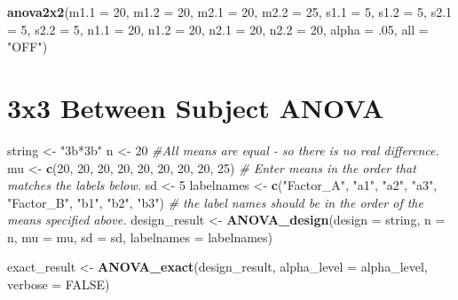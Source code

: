 \documentclass[]{book}
\newenvironment{Shaded}{\begin{snugshade}}{\end{snugshade}}
\newcommand{\CommentTok}[1]{\textcolor[rgb]{0.56,0.35,0.01}{\textit{#1}}}
\newcommand{\DataTypeTok}[1]{\textcolor[rgb]{0.13,0.29,0.53}{#1}}
\newcommand{\DecValTok}[1]{\textcolor[rgb]{0.00,0.00,0.81}{#1}}
\newcommand{\FloatTok}[1]{\textcolor[rgb]{0.00,0.00,0.81}{#1}}
\newcommand{\KeywordTok}[1]{\textcolor[rgb]{0.13,0.29,0.53}{\textbf{#1}}}
\newcommand{\NormalTok}[1]{#1}
\newcommand{\OtherTok}[1]{\textcolor[rgb]{0.56,0.35,0.01}{#1}}
\newcommand{\StringTok}[1]{\textcolor[rgb]{0.31,0.60,0.02}{#1}}
\begin{document}
\begin{Shaded}
\begin{Highlighting}[]
\KeywordTok{anova2x2}\NormalTok{(}\DataTypeTok{m1.1 =} \DecValTok{20}\NormalTok{,}
         \DataTypeTok{m1.2 =} \DecValTok{20}\NormalTok{,}
         \DataTypeTok{m2.1 =} \DecValTok{20}\NormalTok{,}
         \DataTypeTok{m2.2 =} \DecValTok{25}\NormalTok{,}
         \DataTypeTok{s1.1 =} \DecValTok{5}\NormalTok{,}
         \DataTypeTok{s1.2 =} \DecValTok{5}\NormalTok{,}
         \DataTypeTok{s2.1 =} \DecValTok{5}\NormalTok{,}
         \DataTypeTok{s2.2 =} \DecValTok{5}\NormalTok{,}
         \DataTypeTok{n1.1 =} \DecValTok{20}\NormalTok{,}
         \DataTypeTok{n1.2 =} \DecValTok{20}\NormalTok{,}
         \DataTypeTok{n2.1 =} \DecValTok{20}\NormalTok{,}
         \DataTypeTok{n2.2 =} \DecValTok{20}\NormalTok{,}
         \DataTypeTok{alpha =} \FloatTok{.05}\NormalTok{,}
         \DataTypeTok{all =} \StringTok{"OFF"}\NormalTok{)}
\end{Highlighting}
\end{Shaded}

\hypertarget{x3-between-subject-anova}{%
\section{3x3 Between Subject ANOVA}\label{x3-between-subject-anova}}

\begin{Shaded}
\begin{Highlighting}[]
\NormalTok{string <-}\StringTok{ "3b*3b"}
\NormalTok{n <-}\StringTok{ }\DecValTok{20}
\CommentTok{#All means are equal - so there is no real difference.}
\NormalTok{mu <-}\StringTok{ }\KeywordTok{c}\NormalTok{(}\DecValTok{20}\NormalTok{, }\DecValTok{20}\NormalTok{, }\DecValTok{20}\NormalTok{, }\DecValTok{20}\NormalTok{, }\DecValTok{20}\NormalTok{, }\DecValTok{20}\NormalTok{, }\DecValTok{20}\NormalTok{, }\DecValTok{20}\NormalTok{, }\DecValTok{25}\NormalTok{) }
\CommentTok{# Enter means in the order that matches the labels below.}
\NormalTok{sd <-}\StringTok{ }\DecValTok{5}
\NormalTok{labelnames <-}\StringTok{ }\KeywordTok{c}\NormalTok{(}\StringTok{"Factor_A"}\NormalTok{, }\StringTok{"a1"}\NormalTok{, }\StringTok{"a2"}\NormalTok{, }\StringTok{"a3"}\NormalTok{, }\StringTok{"Factor_B"}\NormalTok{, }\StringTok{"b1"}\NormalTok{, }\StringTok{"b2"}\NormalTok{, }\StringTok{"b3"}\NormalTok{) }
\CommentTok{# the label names should be in the order of the means specified above.}
\NormalTok{design_result <-}\StringTok{ }\KeywordTok{ANOVA_design}\NormalTok{(}\DataTypeTok{design =}\NormalTok{ string,}
                   \DataTypeTok{n =}\NormalTok{ n, }
                   \DataTypeTok{mu =}\NormalTok{ mu, }
                   \DataTypeTok{sd =}\NormalTok{ sd, }
                   \DataTypeTok{labelnames =}\NormalTok{ labelnames)}



\NormalTok{exact_result <-}\StringTok{ }\KeywordTok{ANOVA_exact}\NormalTok{(design_result,}
                            \DataTypeTok{alpha_level =}\NormalTok{ alpha_level,}
                            \DataTypeTok{verbose =} \OtherTok{FALSE}\NormalTok{)}
\end{Highlighting}
\end{Shaded}
\end{document}
